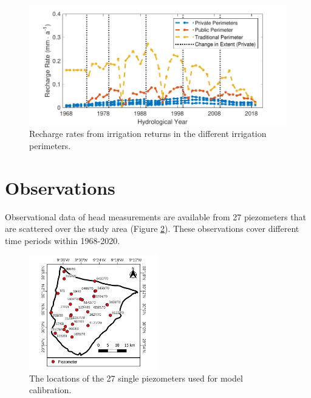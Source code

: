 \begin{figure}[h]
    \centering
    \includegraphics{./img/Fig-IrrigationReturnsTS.pdf}
    \captionsetup{format=hang, textfont=it, labelfont=bf}
    \caption{Recharge rates from irrigation returns in the different irrigation perimeters.}
    \label{Fig-IrrRetTS}
\end{figure}


\section{Observations}
\label{Sec-Piezometers}

Observational data of head measurements are available from 27 piezometers that are scattered over the study area (Figure \ref{Map-Piezometers}). 
These observations cover different time periods within 1968-2020.

\begin{figure}
    \vspace{-21pt}
    \centering
    \includegraphics[width=0.5\textwidth]{./img/Map_PiezometersNamed.pdf}
    \vspace{-16pt}
    \captionsetup{format=plain, textfont=it, labelfont=bf}
    \caption{The locations of the 27 single piezometers used for model calibration.}
    \vspace{-18pt}
    \label{Map-Piezometers}
\end{figure}

